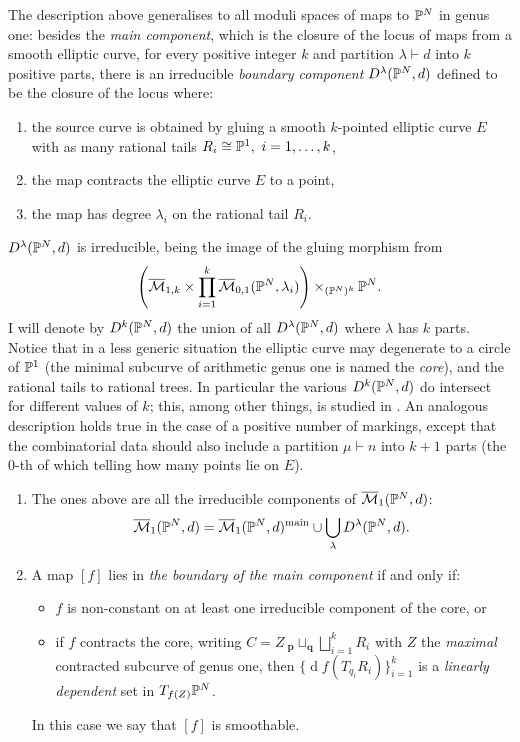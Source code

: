 The description above generalises to all moduli spaces of maps to $\mathbb P^N$ in genus one:
besides the \emph{main component}, which is the closure of the locus of maps from a smooth elliptic curve, for every positive integer $k$ and partition $\lambda\vdash d$ into $k$ positive parts, there is an irreducible \emph{boundary component} $D^{\lambda}(\mathbb P^N,d)$ defined to be the closure of the locus where:
\begin{enumerate}[label=(\roman*)]
\item the source curve is obtained by gluing a smooth $k$-pointed elliptic curve $E$ with as many rational tails $R_i\cong\PP^1,\ i=1,\ldots,k$,
\item the map contracts the elliptic curve $E$ to a point, 
\item the map has degree $\lambda_i$ on the rational tail $R_i$.
\end{enumerate}
$D^{\lambda}(\mathbb P^N,d)$ is irreducible, being the image of the gluing morphism from
\[\left(\overline{\mathcal{M}}_{1,k}\times\prod_{i=1}^k\overline{\mathcal{M}}_{0,1}(\mathbb P^N,\lambda_i)\right)\times_{(\mathbb P^N)^k}\mathbb P^N.\]
I will denote by $D^k(\mathbb P^N,d)$ the union of all $D^{\lambda}(\mathbb P^N,d)$ where $\lambda$ has $k$ parts. Notice that in a less generic situation the elliptic curve may degenerate to a circle of $\mathbb P^1$ (the minimal subcurve of arithmetic genus one is named the \emph{core}), and the rational tails to rational trees. In particular the various $D^k(\mathbb P^N,d)$ do intersect for different values of $k$; this, among other things, is studied in \cite[\S\S 1,4]{VZ}. An analogous description holds true in the case of a positive number of markings, except that the combinatorial data should also include a partition $\mu\vdash n$ into $k+1$ parts (the $0$-th of which telling how many points lie on $E$).

\begin{prop}\label{prop:components}
\begin{enumerate}
 \item The ones above are all the irreducible components of $\overline{\mathcal{M}}_1(\mathbb P^N,d)$: 
\[\overline{\mathcal{M}}_1(\mathbb P^N,d)=\overline{\mathcal{M}}_1(\mathbb P^N,d)^{\rm{main}}\cup\bigcup_{\lambda}D^{\lambda}(\mathbb P^N,d).\]
\item A map $[f]$ lies in \emph{the boundary of the main component}  if and only if:
\begin{itemize}[leftmargin=0cm]
\item $f$ is non-constant on at least one irreducible component of the core, or
\item if $f$ contracts the core, writing $C=Z\ {}_{\mathbf p}\!\sqcup_{\mathbf q}\bigsqcup_{i=1}^k R_i$ with $Z$ the \emph{maximal} contracted subcurve of genus one, then $\{\operatorname{d}\!f(T_{q_i}R_i)\}_{i=1}^k$ is a \emph{linearly dependent} set in $T_{f(Z)}\mathbb P^N$.
\end{itemize}
In this case we say that $[f]$ is smoothable.
\end{enumerate}
\end{prop}
 
